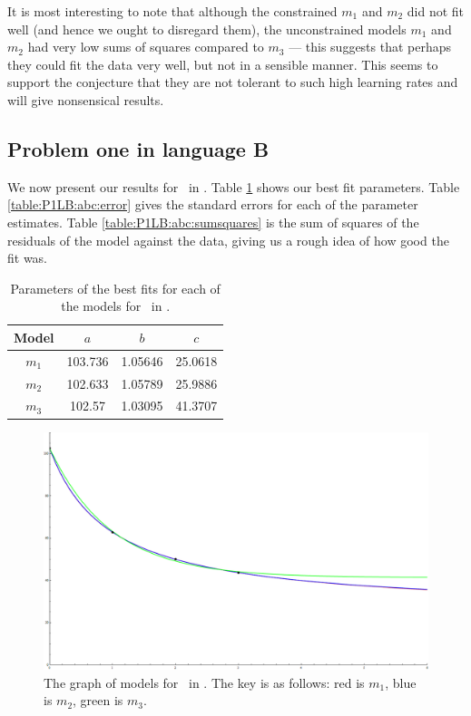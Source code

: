 It is most interesting to note that although the constrained $m_1$ and $m_2$ did
not fit well (and hence we ought to disregard them),
the unconstrained models $m_1$ and $m_2$ had very low sums of
squares compared to $m_3$ --- this suggests that perhaps they could fit the data
very well, but not in a sensible manner.
This seems to support the conjecture that they are not tolerant to such high
learning rates and will give nonsensical results.

\subsection{Problem one in language B} \label{subsecP1LB}

We now present our results for \PO\ in \LB.
Table \ref{table:P1LB:abc} shows our best fit parameters.
Table \ref{table:P1LB:abc:error} gives the standard errors for each of the
parameter estimates.
Table \ref{table:P1LB:abc:sumsquares} is the sum of squares of the residuals of
the model against the data, giving us a rough idea of how good the fit was.

\begin{table}[ht!]
\centering
\begin{tabular}{|c|c|c|c|}
\hline
{\bf Model} &  $a$ & $b$ & $c$ \\
\hline
$m_1$ & 103.736 & 1.05646 & 25.0618 \\
\hline
$m_2$ & 102.633 & 1.05789 & 25.9886\\
\hline
$m_3$ & 102.57 & 1.03095 & 41.3707 \\
\hline
\end{tabular}
\caption{Parameters of the best fits for each of the models for \PO\ in \LB.}
\label{table:P1LB:abc}
\end{table}

\begin{figure}[ht!]
\centering
\includegraphics[scale=0.35,angle=90]{./media/P1LBGraph.png}
\caption{The graph of models for \PO\ in \LB. The key is as follows:
		 red is $m_1$,
		 blue is $m_2$,
		 green is $m_3$.
}
	\label{figure:P1LB:abc}
\end{figure}

